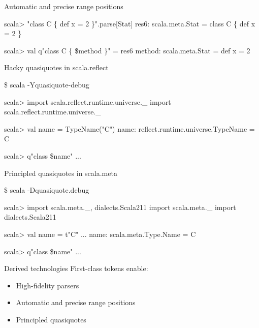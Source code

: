 \documentclass[svgnames,dvipsnames,hyperref={bookmarks=false},usepdftitle=false]{beamer}
\begin{document}
\begin{frame}[fragile]{Automatic and precise range positions}
\begin{semiverbatim}
scala> "class C \{ def x = 2 \}".parse[Stat]
res6: scala.meta.Stat = class C \{ def x = 2 \}

scala> val q"class C \{ \$method \}" = res6
method: scala.meta.Stat = def x = 2

\end{semiverbatim}
\end{frame}

\begin{frame}[fragile]{Hacky quasiquotes in scala.reflect}
\begin{semiverbatim}
\$ scala -Yquasiquote-debug

scala> import scala.reflect.runtime.universe.\_
import scala.reflect.runtime.universe.\_

scala> val name = TypeName("C")
name: reflect.runtime.universe.TypeName = C

scala> q"class \alert<2->{\$name}"
...
\end{semiverbatim}
\end{frame}

\begin{frame}[fragile]{Principled quasiquotes in scala.meta}
\begin{semiverbatim}
\$ scala -Dquasiquote.debug

scala> import scala.meta.\_, dialects.Scala211
import scala.meta.\_
import dialects.Scala211

scala> val name = t"C"
...
name: scala.meta.Type.Name = C

scala> q"class \alert<2->{\$name}"
...
\end{semiverbatim}
\end{frame}

\begin{frame}{Derived technologies}
First-class tokens enable:
\begin{itemize}
\item High-fidelity parsers
\item Automatic and precise range positions
\item Principled quasiquotes
\end{itemize}
\end{frame}
\end{document}
